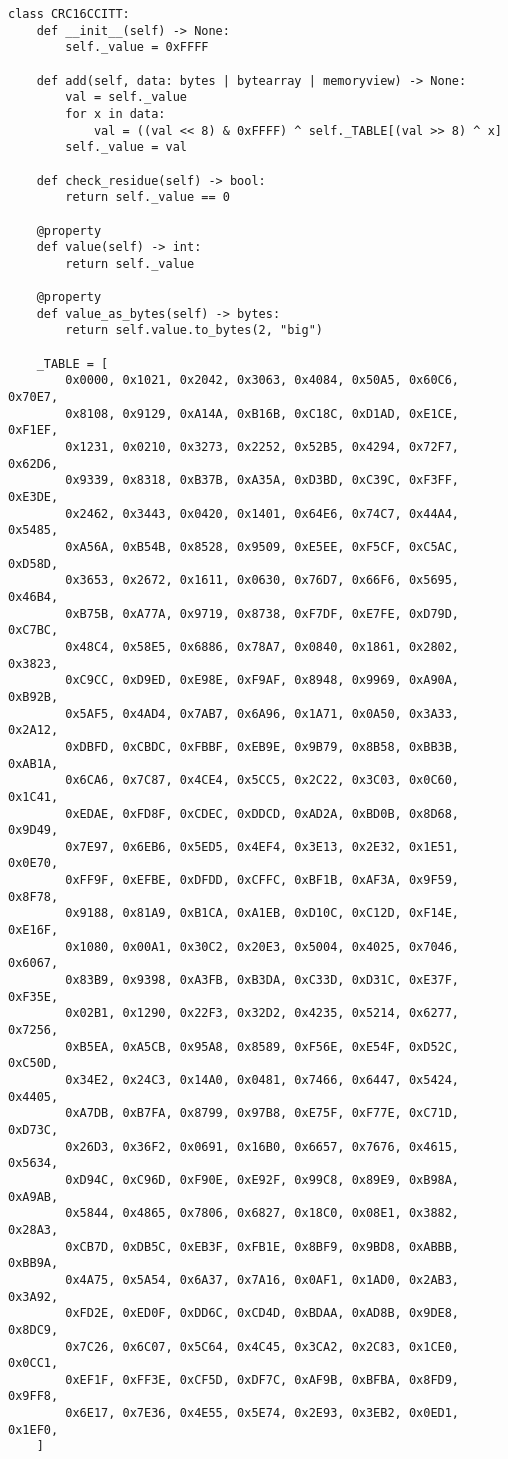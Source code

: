 \begin{samepage}
\begin{verbatim}
class CRC16CCITT:
    def __init__(self) -> None:
        self._value = 0xFFFF

    def add(self, data: bytes | bytearray | memoryview) -> None:
        val = self._value
        for x in data:
            val = ((val << 8) & 0xFFFF) ^ self._TABLE[(val >> 8) ^ x]
        self._value = val

    def check_residue(self) -> bool:
        return self._value == 0

    @property
    def value(self) -> int:
        return self._value

    @property
    def value_as_bytes(self) -> bytes:
        return self.value.to_bytes(2, "big")

    _TABLE = [
        0x0000, 0x1021, 0x2042, 0x3063, 0x4084, 0x50A5, 0x60C6, 0x70E7,
        0x8108, 0x9129, 0xA14A, 0xB16B, 0xC18C, 0xD1AD, 0xE1CE, 0xF1EF,
        0x1231, 0x0210, 0x3273, 0x2252, 0x52B5, 0x4294, 0x72F7, 0x62D6,
        0x9339, 0x8318, 0xB37B, 0xA35A, 0xD3BD, 0xC39C, 0xF3FF, 0xE3DE,
        0x2462, 0x3443, 0x0420, 0x1401, 0x64E6, 0x74C7, 0x44A4, 0x5485,
        0xA56A, 0xB54B, 0x8528, 0x9509, 0xE5EE, 0xF5CF, 0xC5AC, 0xD58D,
        0x3653, 0x2672, 0x1611, 0x0630, 0x76D7, 0x66F6, 0x5695, 0x46B4,
        0xB75B, 0xA77A, 0x9719, 0x8738, 0xF7DF, 0xE7FE, 0xD79D, 0xC7BC,
        0x48C4, 0x58E5, 0x6886, 0x78A7, 0x0840, 0x1861, 0x2802, 0x3823,
        0xC9CC, 0xD9ED, 0xE98E, 0xF9AF, 0x8948, 0x9969, 0xA90A, 0xB92B,
        0x5AF5, 0x4AD4, 0x7AB7, 0x6A96, 0x1A71, 0x0A50, 0x3A33, 0x2A12,
        0xDBFD, 0xCBDC, 0xFBBF, 0xEB9E, 0x9B79, 0x8B58, 0xBB3B, 0xAB1A,
        0x6CA6, 0x7C87, 0x4CE4, 0x5CC5, 0x2C22, 0x3C03, 0x0C60, 0x1C41,
        0xEDAE, 0xFD8F, 0xCDEC, 0xDDCD, 0xAD2A, 0xBD0B, 0x8D68, 0x9D49,
        0x7E97, 0x6EB6, 0x5ED5, 0x4EF4, 0x3E13, 0x2E32, 0x1E51, 0x0E70,
        0xFF9F, 0xEFBE, 0xDFDD, 0xCFFC, 0xBF1B, 0xAF3A, 0x9F59, 0x8F78,
        0x9188, 0x81A9, 0xB1CA, 0xA1EB, 0xD10C, 0xC12D, 0xF14E, 0xE16F,
        0x1080, 0x00A1, 0x30C2, 0x20E3, 0x5004, 0x4025, 0x7046, 0x6067,
        0x83B9, 0x9398, 0xA3FB, 0xB3DA, 0xC33D, 0xD31C, 0xE37F, 0xF35E,
        0x02B1, 0x1290, 0x22F3, 0x32D2, 0x4235, 0x5214, 0x6277, 0x7256,
        0xB5EA, 0xA5CB, 0x95A8, 0x8589, 0xF56E, 0xE54F, 0xD52C, 0xC50D,
        0x34E2, 0x24C3, 0x14A0, 0x0481, 0x7466, 0x6447, 0x5424, 0x4405,
        0xA7DB, 0xB7FA, 0x8799, 0x97B8, 0xE75F, 0xF77E, 0xC71D, 0xD73C,
        0x26D3, 0x36F2, 0x0691, 0x16B0, 0x6657, 0x7676, 0x4615, 0x5634,
        0xD94C, 0xC96D, 0xF90E, 0xE92F, 0x99C8, 0x89E9, 0xB98A, 0xA9AB,
        0x5844, 0x4865, 0x7806, 0x6827, 0x18C0, 0x08E1, 0x3882, 0x28A3,
        0xCB7D, 0xDB5C, 0xEB3F, 0xFB1E, 0x8BF9, 0x9BD8, 0xABBB, 0xBB9A,
        0x4A75, 0x5A54, 0x6A37, 0x7A16, 0x0AF1, 0x1AD0, 0x2AB3, 0x3A92,
        0xFD2E, 0xED0F, 0xDD6C, 0xCD4D, 0xBDAA, 0xAD8B, 0x9DE8, 0x8DC9,
        0x7C26, 0x6C07, 0x5C64, 0x4C45, 0x3CA2, 0x2C83, 0x1CE0, 0x0CC1,
        0xEF1F, 0xFF3E, 0xCF5D, 0xDF7C, 0xAF9B, 0xBFBA, 0x8FD9, 0x9FF8,
        0x6E17, 0x7E36, 0x4E55, 0x5E74, 0x2E93, 0x3EB2, 0x0ED1, 0x1EF0,
    ]
\end{verbatim}
\end{samepage}

